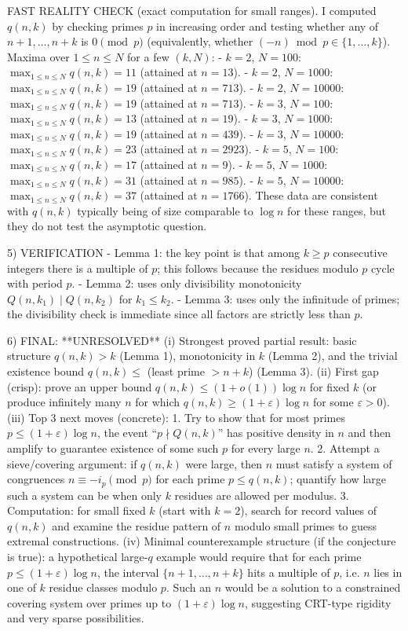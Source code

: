 FAST REALITY CHECK (exact computation for small ranges).
I computed $q(n,k)$ by checking primes $p$ in increasing order and testing whether any of $n+1,\ldots,n+k$ is $0\pmod p$ (equivalently, whether $(-n)\bmod p\in\{1,\ldots,k\}$).
Maxima over $1\le n\le N$ for a few $(k,N)$:
- $k=2$, $N=100$: $\max_{1\le n\le N} q(n,k) = 11$ (attained at $n=13$).
- $k=2$, $N=1000$: $\max_{1\le n\le N} q(n,k) = 19$ (attained at $n=713$).
- $k=2$, $N=10000$: $\max_{1\le n\le N} q(n,k) = 19$ (attained at $n=713$).
- $k=3$, $N=100$: $\max_{1\le n\le N} q(n,k) = 13$ (attained at $n=19$).
- $k=3$, $N=1000$: $\max_{1\le n\le N} q(n,k) = 19$ (attained at $n=439$).
- $k=3$, $N=10000$: $\max_{1\le n\le N} q(n,k) = 23$ (attained at $n=2923$).
- $k=5$, $N=100$: $\max_{1\le n\le N} q(n,k) = 17$ (attained at $n=9$).
- $k=5$, $N=1000$: $\max_{1\le n\le N} q(n,k) = 31$ (attained at $n=985$).
- $k=5$, $N=10000$: $\max_{1\le n\le N} q(n,k) = 37$ (attained at $n=1766$).
These data are consistent with $q(n,k)$ typically being of size comparable to $\log n$ for these ranges, but they do not test the asymptotic question.

5) VERIFICATION
- Lemma 1: the key point is that among $k\ge p$ consecutive integers there is a multiple of $p$; this follows because the residues modulo $p$ cycle with period $p$.
- Lemma 2: uses only divisibility monotonicity $Q(n,k_1)\mid Q(n,k_2)$ for $k_1\le k_2$.
- Lemma 3: uses only the infinitude of primes; the divisibility check is immediate since all factors are strictly less than $p$.

6) FINAL: **UNRESOLVED**
(i) Strongest proved partial result: basic structure $q(n,k)>k$ (Lemma 1), monotonicity in $k$ (Lemma 2), and the trivial existence bound $q(n,k)\le$ (least prime $>n+k$) (Lemma 3).
(ii) First gap (crisp): prove an upper bound $q(n,k)\le (1+o(1))\log n$ for fixed $k$ (or produce infinitely many $n$ for which $q(n,k)\ge (1+\varepsilon)\log n$ for some $\varepsilon>0$).
(iii) Top 3 next moves (concrete):
  1. Try to show that for most primes $p\le (1+\varepsilon)\log n$, the event ``$p\nmid Q(n,k)$'' has positive density in $n$ and then amplify to guarantee existence of some such $p$ for every large $n$.
  2. Attempt a sieve/covering argument: if $q(n,k)$ were large, then $n$ must satisfy a system of congruences $n\equiv -i_p\pmod p$ for each prime $p\le q(n,k)$; quantify how large such a system can be when only $k$ residues are allowed per modulus.
  3. Computation: for small fixed $k$ (start with $k=2$), search for record values of $q(n,k)$ and examine the residue pattern of $n$ modulo small primes to guess extremal constructions.
(iv) Minimal counterexample structure (if the conjecture is true): a hypothetical large-$q$ example would require that for each prime $p\le (1+\varepsilon)\log n$, the interval $\{n+1,\ldots,n+k\}$ hits a multiple of $p$, i.e. $n$ lies in one of $k$ residue classes modulo $p$. Such an $n$ would be a solution to a constrained covering system over primes up to $(1+\varepsilon)\log n$, suggesting CRT-type rigidity and very sparse possibilities.


